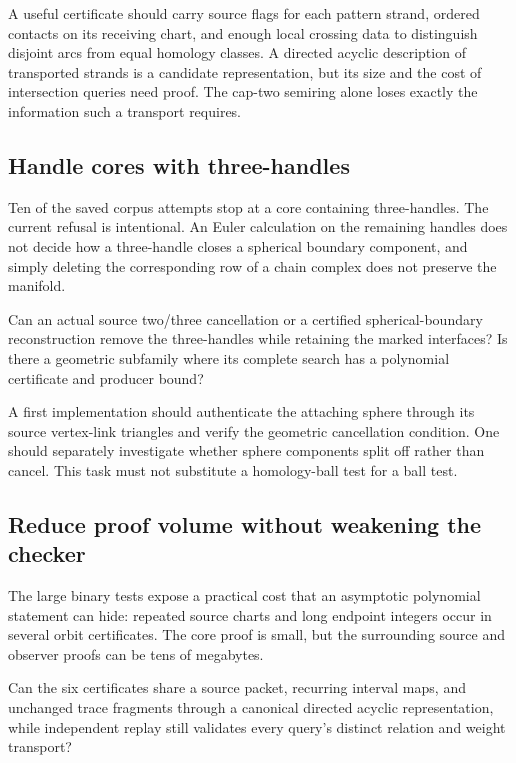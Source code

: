 A useful certificate should carry source flags for each pattern strand,
ordered contacts on its receiving chart, and enough local crossing data to
distinguish disjoint arcs from equal homology classes.  A directed acyclic
description of transported strands is a candidate representation, but its
size and the cost of intersection queries need proof.  The cap-two semiring
alone loses exactly the information such a transport requires.

\subsection{Handle cores with three-handles}

Ten of the saved corpus attempts stop at a core containing three-handles.
The current refusal is intentional.  An Euler calculation on the remaining
handles does not decide how a three-handle closes a spherical boundary
component, and simply deleting the corresponding row of a chain complex
does not preserve the manifold.

\begin{question}
Can an actual source two/three cancellation or a certified spherical-boundary
reconstruction remove the three-handles while retaining the marked interfaces?
Is there a geometric subfamily where its complete search has a polynomial
certificate and producer bound?
\end{question}

A first implementation should authenticate the attaching sphere through its
source vertex-link triangles and verify the geometric cancellation condition.
One should separately investigate whether sphere components split off rather
than cancel.  This task must not substitute a homology-ball test for a ball test.

\subsection{Reduce proof volume without weakening the checker}

The large binary tests expose a practical cost that an asymptotic polynomial
statement can hide: repeated source charts and long endpoint integers occur
in several orbit certificates.  The core proof is small, but the surrounding
source and observer proofs can be tens of megabytes.

\begin{question}
Can the six certificates share a source packet, recurring interval maps, and
unchanged trace fragments through a canonical directed acyclic representation,
while independent replay still validates every query's distinct relation and
weight transport?
\end{question}

